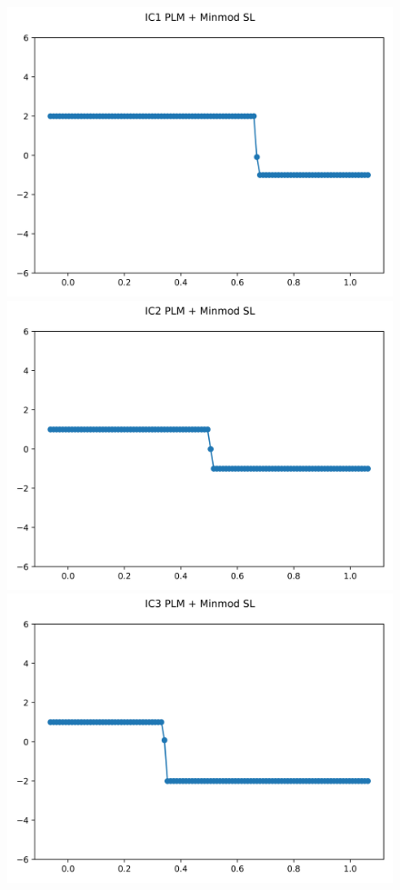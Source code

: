 \documentclass{article}
\begin{document}
\begin{figure}[t]
    \emp
        \centering
        \includegraphics[width=.95\textwidth]{../../code/hires_IC1Methodpm_plot.png}
        \includegraphics[width=.95\textwidth]{../../code/hires_IC2Methodpm_plot.png}
        \includegraphics[width=.95\textwidth]{../../code/hires_IC3Methodpm_plot.png}

\end{figure}
\end{document}
